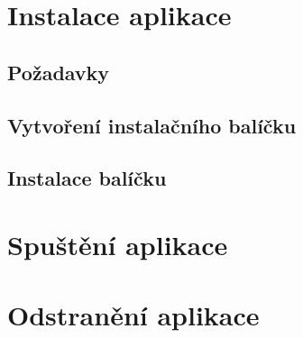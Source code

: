 \label{appendix:installation}

\section{Instalace aplikace}
\subsection{Požadavky}
\subsection{Vytvoření instalačního balíčku}
\subsection{Instalace balíčku}

\section{Spuštění aplikace}

\section{Odstranění aplikace}